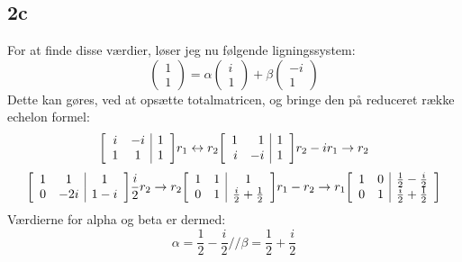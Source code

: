 \documentclass{article}
\begin{document}
\subsection*{2c}
For at finde disse værdier, løser jeg nu følgende ligningssystem:
$$
\left(\begin{array}{l}
1 \\
1
\end{array}\right)=\alpha\left(\begin{array}{l}
i \\
1
\end{array}\right)+\beta\left(\begin{array}{c}
-i \\
1
\end{array}\right)
$$
Dette kan gøres, ved at opsætte totalmatricen, og bringe den på reduceret række echelon formel:
$$
{\left[\begin{array}{cc|c}
i & -i & 1 \\
1 & 1 & 1
\end{array}\right]} \\
r_1 \leftrightarrow r_2 \\
{\left[\begin{array}{rr|r}
1 & 1 & 1 \\
i & -i & 1
\end{array}\right]} \\
r_2-i r_1 \rightarrow r_2
$$
$$
{\left[\begin{array}{cc|c}
1 & 1 & 1 \\
0 & -2 i & 1-i
\end{array}\right]} \\
\frac{i}{2} r_2 \rightarrow r_2 \\
{\left[\begin{array}{cc|c}
1 & 1 & 1 \\
0 & 1 & \frac{i}{2}+\frac{1}{2}
\end{array}\right]} \\
r_1-r_2 \rightarrow r_1 \\
{\left[\begin{array}{ll|l}
1 & 0 & \frac{1}{2}-\frac{i}{2} \\
0 & 1 & \frac{i}{2}+\frac{1}{2}
\end{array}\right]}
$$
Værdierne for alpha og beta er dermed:
$$
\alpha=\frac{1}{2}-\frac{i}{2} // \beta=\frac{1}{2}+\frac{i}{2}
$$
\end{document}
